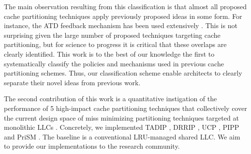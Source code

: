 The main observation resulting from this classification is that almost all proposed cache partitioning techniques apply previously proposed ideas in some form.
For instance, the ATD feedback mechanism has been used extensively .
This is not surprising given the large number of proposed techniques targeting cache partitioning, but for science to progress it is critical that these overlaps are clearly identified.
This work is to the best of our knowledge the first to systematically classify the policies and mechanisms used in previous cache partitioning schemes.
Thus, our classification scheme enable architects to clearly separate their novel ideas from previous work.

The second contribution of this work is a quantitative instigation of the performance of 5 high-impact cache partitioning techniques that collectively cover the current design space of miss minimizing partitioning techniques targeted at monolithic LLCs .
Concretely, we implemented TADIP \cite{jaleel08}, DRRIP \cite{jaleel10}, UCP \cite{utilityBasedCachePartitioning}, PIPP \cite{xie09} and PriSM \cite{manikantan12}.
The baseline is a conventional LRU-managed shared LLC.
We aim to provide our implementations to the research community.


